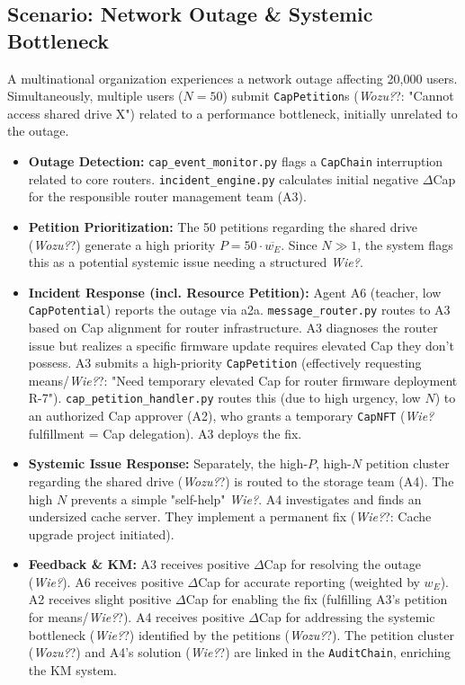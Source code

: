 \documentclass[12pt, a4paper]{scrartcl}
\newcommand{\DeltaCap}{$\Delta$Cap}                    %
\newcommand{\CapPotential}{\texttt{CapPotential}}    %
\newcommand{\CapNFT}{\texttt{CapNFT}}
\newcommand{\CapChain}{\texttt{CapChain}}
\newcommand{\AuditChain}{\texttt{AuditChain}}
\newcommand{\CapPetition}{\texttt{CapPetition}}        %
\newcommand{\Wozu}{\textit{Wozu?}}                      %
\newcommand{\Wie}{\textit{Wie?}}                        %
\begin{document}
\subsection{Scenario: Network Outage \& Systemic Bottleneck}


A multinational organization experiences a network outage affecting 20,000 users. Simultaneously, multiple users ($N=50$) submit \CapPetition{}s (\Wozu?: "Cannot access shared drive X") related to a performance bottleneck, initially unrelated to the outage.

\begin{itemize}
    \item \textbf{Outage Detection:} \texttt{cap\_event\_monitor.py} flags a \CapChain{} interruption related to core routers. \texttt{incident\_engine.py} calculates initial negative \DeltaCap{} for the responsible router management team (A3).
    \item \textbf{Petition Prioritization:} The 50 petitions regarding the shared drive (\Wozu?) generate a high priority $P = 50 \cdot \overline{w_E}$. Since $N \gg 1$, the system flags this as a potential systemic issue needing a structured \Wie{}.
    \item \textbf{Incident Response (incl. Resource Petition):} Agent A6 (teacher, low \CapPotential{}) reports the outage via a2a. \texttt{message\_router.py} routes to A3 based on Cap alignment for router infrastructure. A3 diagnoses the router issue but realizes a specific firmware update requires elevated Cap they don't possess. A3 submits a high-priority \CapPetition{} (effectively requesting means/\Wie?: "Need temporary elevated Cap for router firmware deployment R-7"). \texttt{cap\_petition\_handler.py} routes this (due to high urgency, low $N$) to an authorized Cap approver (A2), who grants a temporary \CapNFT{} (\Wie{} fulfillment = Cap delegation). A3 deploys the fix.
    \item \textbf{Systemic Issue Response:} Separately, the high-$P$, high-$N$ petition cluster regarding the shared drive (\Wozu?) is routed to the storage team (A4). The high $N$ prevents a simple "self-help" \Wie{}. A4 investigates and finds an undersized cache server. They implement a permanent fix (\Wie?: Cache upgrade project initiated).
    \item \textbf{Feedback \& KM:} A3 receives positive \DeltaCap{} for resolving the outage (\Wie{}). A6 receives positive \DeltaCap{} for accurate reporting (weighted by $w_E$). A2 receives slight positive \DeltaCap{} for enabling the fix (fulfilling A3's petition for means/\Wie?). A4 receives positive \DeltaCap{} for addressing the systemic bottleneck (\Wie?) identified by the petitions (\Wozu?). The petition cluster (\Wozu?) and A4's solution (\Wie?) are linked in the \AuditChain{}, enriching the KM system.
\end{itemize}
\end{document}
